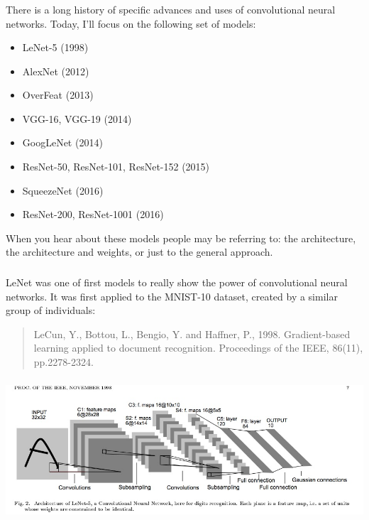 \documentclass[xetex,mathserif,serif,aspectratio=169]{beamer}
\begin{document}
\begin{frame}[fragile] \frametitle{} \oldB \small


There is a long history of specific advances and uses of convolutional
neural networks. Today, I'll focus on the following set of models: \vspace*{-0.5cm}
\begin{itemize}
\item LeNet-5 (1998)
\item AlexNet (2012)
\item OverFeat (2013)
\item VGG-16, VGG-19 (2014)
\item GoogLeNet (2014)
\item ResNet-50, ResNet-101, ResNet-152 (2015)
\item SqueezeNet (2016)
\item ResNet-200, ResNet-1001 (2016)
\end{itemize} \vspace*{-0.5cm}
When you hear about these models people may be referring to: the architecture,
the architecture and weights, or just to the general approach.

\end{frame}

\begin{frame}[fragile] \frametitle{} \oldB \small


LeNet was one of first models to really show the power of convolutional
neural networks. It was first applied to the MNIST-10 dataset, created
by a similar group of individuals:
\begin{quote}
LeCun, Y., Bottou, L., Bengio, Y. and Haffner, P., 1998. Gradient-based
learning applied to document recognition. Proceedings of the IEEE, 86(11),
pp.2278-2324.
\end{quote}

\end{frame}

\begin{frame}[fragile] \frametitle{} \oldB \small

\begin{center}
\includegraphics[width=\textwidth]{img/lenet5.jpg}
\end{center}

\end{frame}
\end{document}
